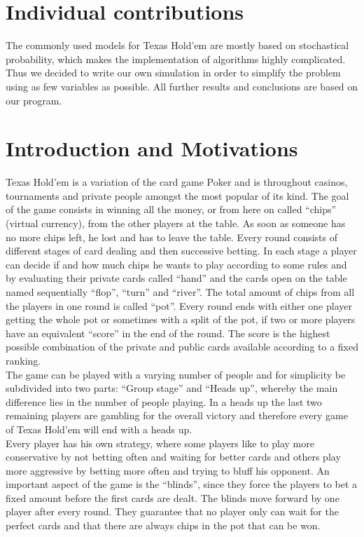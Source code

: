 \documentclass[11pt]{article}
\begin{document}
\section{Individual contributions}

The commonly used models for Texas Hold'em are mostly based on stochastical probability, which makes the implementation of algorithms highly complicated. Thus we decided to write our own simulation in order to simplify the problem using as few variables as possible. All further results and conclusions are based on our program.


\section{Introduction and Motivations}

Texas Hold’em is a variation of the card game Poker and is throughout casinos, tournaments and private people amongst the most popular of its kind. The goal of the game consists in winning all the money, or from here on called “chips” (virtual currency), from the other players at the table. As soon as someone has no more chips left, he lost and has to leave the table.
Every round consists of different stages of card dealing and then successive betting. In each stage a player can decide if and how much chips he wants to play according to some rules and by evaluating their private cards called “hand” and the cards open on the table named sequentially “flop”, “turn” and “river”.
The total amount of chips from all the players in one round is called “pot”. Every round ends with either one player getting the whole pot or sometimes with a split of the pot, if two or more players have an equivalent “score” in the end of the round. The score is the highest possible combination of the private and public cards available according to a fixed ranking.
\\
The game can be played with a varying number of people and for simplicity be subdivided into two parts: “Group stage” and “Heads up”, whereby the main difference lies in the number of people playing. In a heads up the last two remaining players are gambling for the overall victory and therefore every game of Texas Hold’em will end with a heads up.
\\
Every player has his own strategy, where some players like to play more conservative by not betting often and waiting for better cards and others play more aggressive by betting more often and trying to bluff his opponent. An important aspect of the game is the “blinds”, since they force the players to bet a fixed amount before the first cards are dealt. The blinds move forward by one player after every round. They guarantee that no player only can wait for the perfect cards and that there are always chips in the pot that can be won.
\end{document}
